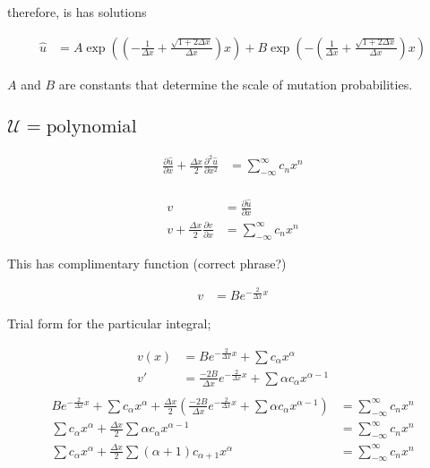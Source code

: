 \documentclass[a4paper]{article}
\begin{document}
therefore, is has solutions 

\begin{align*}
\hat{u} & = A \exp \left( \left( - \frac{1}{\Delta x} + \frac{\sqrt{1 + 2 \Delta x}}{\Delta x} \right) x \right) + B \exp \left( - \left( \frac{1}{\Delta x} + \frac{\sqrt{1 + 2 \Delta x}}{\Delta x} \right) x \right)
\end{align*}

$A$ and $B$ are constants that determine the scale of mutation probabilities. 

\subsection{$\mathcal{U} = \text{polynomial}$ }

\begin{align*}
 \frac{\partial \hat{u}}{\partial x} + \frac{\Delta x}{2} \frac{\partial ^2 \hat{u}}{\partial x^2} & = \sum _{- \infty} ^{\infty} c_n x^n \\ 
\end{align*}

\begin{align*}
v & = \frac{\partial \hat{u}}{\partial x} \\
v + \frac{\Delta x }{2} \frac{\partial v}{\partial x} & =  \sum _{- \infty} ^{\infty} c_n x^n
\end{align*}

This has complimentary function (correct phrase?) 

\begin{align*}
v & = B e^{- \frac{2}{\Delta x} x}
\end{align*}

Trial form for the particular integral;

\begin{align*}
v(x) & = B e^{- \frac{2}{\Delta x} x} + \sum c_{\alpha } x^{\alpha } \\
v ' & = \frac{-2 B}{\Delta x} e^{- \frac{2}{\Delta x} x} + \sum \alpha c_{\alpha} x^{\alpha - 1} \\
\end{align*}
\begin{align*}
B e^{- \frac{2}{\Delta x} x} + \sum c_{\alpha } x^{\alpha } + \frac{\Delta x}{2} \left( \frac{-2 B}{\Delta x} e^{- \frac{2}{\Delta x} x} + \sum \alpha c_{\alpha} x^{\alpha - 1} \right) & = \sum _{- \infty} ^{\infty} c_n x^n \\
\sum c_{\alpha } x^{\alpha } + \frac{\Delta x}{2} \sum  \alpha c_{\alpha } x^{\alpha -1 } & = \sum _{- \infty} ^{\infty} c_n x^n \\
\sum c_{\alpha } x^{\alpha } + \frac{\Delta x}{2} \sum ( \alpha + 1 ) c_{\alpha + 1} x ^{\alpha } & = \sum _{- \infty} ^{\infty} c_n x^n
\end{align*}
\end{document}
